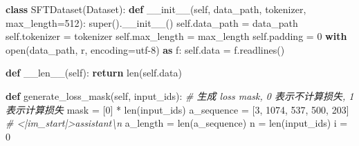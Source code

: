 \documentclass[
]{article}
\newenvironment{Shaded}{}{}
\newcommand{\BuiltInTok}[1]{\textcolor[rgb]{0.00,0.50,0.00}{#1}}
\newcommand{\CommentTok}[1]{\textcolor[rgb]{0.38,0.63,0.69}{\textit{#1}}}
\newcommand{\ControlFlowTok}[1]{\textcolor[rgb]{0.00,0.44,0.13}{\textbf{#1}}}
\newcommand{\DecValTok}[1]{\textcolor[rgb]{0.25,0.63,0.44}{#1}}
\newcommand{\FunctionTok}[1]{\textcolor[rgb]{0.02,0.16,0.49}{#1}}
\newcommand{\ImportTok}[1]{\textcolor[rgb]{0.00,0.50,0.00}{\textbf{#1}}}
\newcommand{\KeywordTok}[1]{\textcolor[rgb]{0.00,0.44,0.13}{\textbf{#1}}}
\newcommand{\NormalTok}[1]{#1}
\newcommand{\OperatorTok}[1]{\textcolor[rgb]{0.40,0.40,0.40}{#1}}
\newcommand{\StringTok}[1]{\textcolor[rgb]{0.25,0.44,0.63}{#1}}
\newcommand{\VariableTok}[1]{\textcolor[rgb]{0.10,0.09,0.49}{#1}}
\begin{document}
\begin{Shaded}
\begin{Highlighting}[]
\KeywordTok{class}\NormalTok{ SFTDataset(Dataset):}
    \KeywordTok{def} \FunctionTok{\_\_init\_\_}\NormalTok{(}\VariableTok{self}\NormalTok{, data\_path, tokenizer, max\_length}\OperatorTok{=}\DecValTok{512}\NormalTok{):}
        \BuiltInTok{super}\NormalTok{().}\FunctionTok{\_\_init\_\_}\NormalTok{()}
        \VariableTok{self}\NormalTok{.data\_path }\OperatorTok{=}\NormalTok{ data\_path}
        \VariableTok{self}\NormalTok{.tokenizer }\OperatorTok{=}\NormalTok{ tokenizer}
        \VariableTok{self}\NormalTok{.max\_length }\OperatorTok{=}\NormalTok{ max\_length}
        \VariableTok{self}\NormalTok{.padding }\OperatorTok{=} \DecValTok{0}
        \ControlFlowTok{with} \BuiltInTok{open}\NormalTok{(data\_path, }\StringTok{\textquotesingle{}r\textquotesingle{}}\NormalTok{, encoding}\OperatorTok{=}\StringTok{\textquotesingle{}utf{-}8\textquotesingle{}}\NormalTok{) }\ImportTok{as}\NormalTok{ f:}
            \VariableTok{self}\NormalTok{.data }\OperatorTok{=}\NormalTok{ f.readlines()}

    \KeywordTok{def} \FunctionTok{\_\_len\_\_}\NormalTok{(}\VariableTok{self}\NormalTok{):}
        \ControlFlowTok{return} \BuiltInTok{len}\NormalTok{(}\VariableTok{self}\NormalTok{.data)}

    \KeywordTok{def}\NormalTok{ generate\_loss\_mask(}\VariableTok{self}\NormalTok{, input\_ids):}
        \CommentTok{\# 生成 loss mask, 0 表示不计算损失, 1 表示计算损失}
\NormalTok{        mask }\OperatorTok{=}\NormalTok{ [}\DecValTok{0}\NormalTok{] }\OperatorTok{*} \BuiltInTok{len}\NormalTok{(input\_ids)}
\NormalTok{        a\_sequence }\OperatorTok{=}\NormalTok{ [}\DecValTok{3}\NormalTok{, }\DecValTok{1074}\NormalTok{, }\DecValTok{537}\NormalTok{, }\DecValTok{500}\NormalTok{, }\DecValTok{203}\NormalTok{]  }\CommentTok{\# \textless{}|im\_start|\textgreater{}assistant\textbackslash{}n}
\NormalTok{        a\_length }\OperatorTok{=} \BuiltInTok{len}\NormalTok{(a\_sequence)}
\NormalTok{        n }\OperatorTok{=} \BuiltInTok{len}\NormalTok{(input\_ids)}
\NormalTok{        i }\OperatorTok{=} \DecValTok{0}
        

\end{Highlighting}
\end{Shaded}
\end{document}

